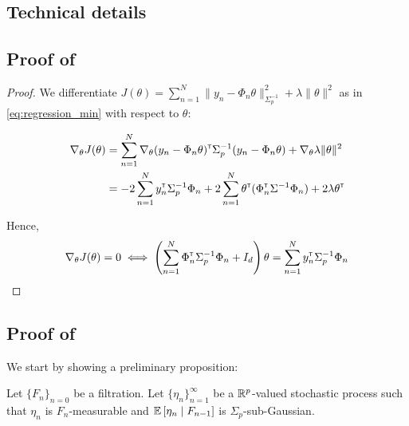 \begin{subappendices}
	
	\section{Technical details}
	
	\subsection{Proof of }
	\label{sec:proof-regularized_solution}
	
	\begin{proof}
		We differentiate $J(\theta) = \sum_{n=1}^N \|y_n -\Phi_n\theta\|_{\Sigma_p^{-1}}^2 + \lambda\|\theta\|_{}^2$ as in  \eqref{eq:regression_min} with respect to $\theta$:
		
		\begin{align*}
		\nabla_{\theta} J(\theta) &= \sum_{n=1}^N\nabla_{\theta} (y_n - \Phi_n\theta)^{\mathsf{\scriptscriptstyle T}}\Sigma_p^{-1}(y_n - \Phi_n\theta) + \nabla_{\theta} \lambda\|\theta\|_{}^2\\
		&= -2\sum_{n=1}^N y_n^{\mathsf{\scriptscriptstyle T}}\Sigma_p^{-1}\Phi_n + 2\sum_{n=1}^N\theta^{\mathsf{\scriptscriptstyle T}}(\Phi_n^{\mathsf{\scriptscriptstyle T}}\Sigma^{-1}\Phi_n) +  2 \lambda \theta^{\mathsf{\scriptscriptstyle T}}
		\end{align*}
		
		Hence,
		\begin{align*}
		\nabla_{\theta} J(\theta) = 0 \iff \left(\sum_{n=1}^N\Phi_n^{\mathsf{\scriptscriptstyle T}}\Sigma_p^{-1}\Phi_n + I_d\right)\theta = \sum_{n=1}^N y_n^{\mathsf{\scriptscriptstyle T}}\Sigma_p^{-1}\Phi_n
		\end{align*}
	\end{proof}
	
	\subsection{Proof of }
	\label{sec:proof-confidence_ellipsoid}
	
	We start by showing a preliminary proposition:
	
	\begin{proposition}
		\label{prop:concentration}
		\begin{leftbar}[propositionbar]
		Let $\{F_n\}_{n=0}$ be a filtration.
		Let $\{\eta_n\}_{n=1}^\infty$ be a $\mathbb{R}^p$-valued stochastic process such that $\eta_n$ is $F_n$-measurable and $\operatorname*{\mathbb{E}}\left[\eta_n\;\middle|\; F_{n-1}\right]$ is $\Sigma_p$-sub-Gaussian.
		

\end{leftbar}
\end{proposition}
\end{subappendices}
